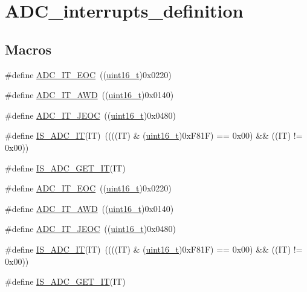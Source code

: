 \hypertarget{group___a_d_c__interrupts__definition}{}\section{A\+D\+C\+\_\+interrupts\+\_\+definition}
\label{group___a_d_c__interrupts__definition}
\subsection*{Macros}
\begin{DoxyCompactItemize}
\item 
\#define \hyperlink{group___a_d_c__interrupts__definition_ga0ad335d835f54415194d448019569e00}{A\+D\+C\+\_\+\+I\+T\+\_\+\+E\+OC}~((\hyperlink{_p_e___types_8h_a1f1825b69244eb3ad2c7165ddc99c956}{uint16\+\_\+t})0x0220)
\item 
\#define \hyperlink{group___a_d_c__interrupts__definition_ga2f5c7f9900c24250a0c6ccaa7cbca946}{A\+D\+C\+\_\+\+I\+T\+\_\+\+A\+WD}~((\hyperlink{_p_e___types_8h_a1f1825b69244eb3ad2c7165ddc99c956}{uint16\+\_\+t})0x0140)
\item 
\#define \hyperlink{group___a_d_c__interrupts__definition_gad439fc0cd69706704d47aeabfeddb631}{A\+D\+C\+\_\+\+I\+T\+\_\+\+J\+E\+OC}~((\hyperlink{_p_e___types_8h_a1f1825b69244eb3ad2c7165ddc99c956}{uint16\+\_\+t})0x0480)
\item 
\#define \hyperlink{group___a_d_c__interrupts__definition_gaf5f8d35930becff402eeb8220641432f}{I\+S\+\_\+\+A\+D\+C\+\_\+\+IT}(IT)~((((IT) \& (\hyperlink{_p_e___types_8h_a1f1825b69244eb3ad2c7165ddc99c956}{uint16\+\_\+t})0x\+F81\+F) == 0x00) \&\& ((\+I\+T) != 0x00))
\item 
\#define \hyperlink{group___a_d_c__interrupts__definition_gacae69f04de1a0033f065864d868c006e}{I\+S\+\_\+\+A\+D\+C\+\_\+\+G\+E\+T\+\_\+\+IT}(IT)
\item 
\#define \hyperlink{group___a_d_c__interrupts__definition_ga0ad335d835f54415194d448019569e00}{A\+D\+C\+\_\+\+I\+T\+\_\+\+E\+OC}~((\hyperlink{_p_e___types_8h_a1f1825b69244eb3ad2c7165ddc99c956}{uint16\+\_\+t})0x0220)
\item 
\#define \hyperlink{group___a_d_c__interrupts__definition_ga2f5c7f9900c24250a0c6ccaa7cbca946}{A\+D\+C\+\_\+\+I\+T\+\_\+\+A\+WD}~((\hyperlink{_p_e___types_8h_a1f1825b69244eb3ad2c7165ddc99c956}{uint16\+\_\+t})0x0140)
\item 
\#define \hyperlink{group___a_d_c__interrupts__definition_gad439fc0cd69706704d47aeabfeddb631}{A\+D\+C\+\_\+\+I\+T\+\_\+\+J\+E\+OC}~((\hyperlink{_p_e___types_8h_a1f1825b69244eb3ad2c7165ddc99c956}{uint16\+\_\+t})0x0480)
\item 
\#define \hyperlink{group___a_d_c__interrupts__definition_gaf5f8d35930becff402eeb8220641432f}{I\+S\+\_\+\+A\+D\+C\+\_\+\+IT}(IT)~((((IT) \& (\hyperlink{_p_e___types_8h_a1f1825b69244eb3ad2c7165ddc99c956}{uint16\+\_\+t})0x\+F81\+F) == 0x00) \&\& ((\+I\+T) != 0x00))
\item 
\#define \hyperlink{group___a_d_c__interrupts__definition_gacae69f04de1a0033f065864d868c006e}{I\+S\+\_\+\+A\+D\+C\+\_\+\+G\+E\+T\+\_\+\+IT}(IT)
\end{DoxyCompactItemize}


